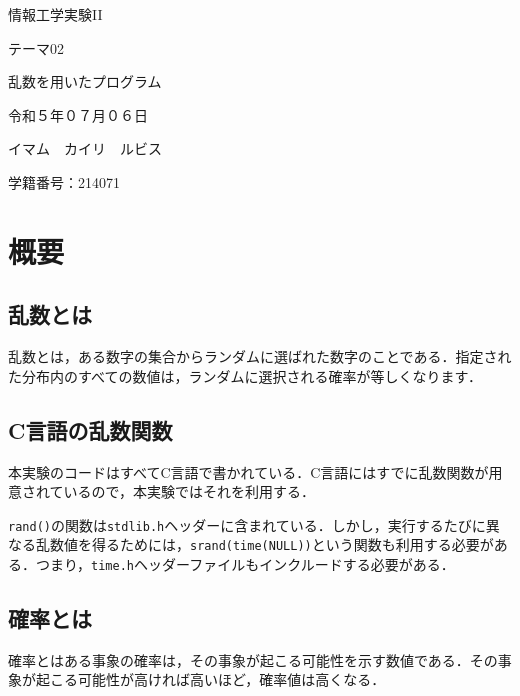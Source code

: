 \documentclass[a4j, titlepage]{jarticle}
\begin{document}
  \begin{center}
  \huge 情報工学実験II\par
  \vspace{15mm}
  \huge テーマ02 \par
  \huge 乱数を用いたプログラム \par
  \vspace{15mm}
  \vspace{20mm}
  \vspace{100mm}
  \Large 令和５年０７月０６日 \par
  \vspace{15mm}
  \Large イマム　カイリ　ルビス \par
  \vspace{10mm}
  \Large 学籍番号：214071\par
  \vspace{10mm}
\end{center}
\clearpage

\tableofcontents
\clearpage

\section{概要}
  \subsection{乱数とは}
    乱数とは，ある数字の集合からランダムに選ばれた数字のことである．指定された分布内のすべての数値は，ランダムに選択される確率が等しくなります．

  \subsection{C言語の乱数関数}
    本実験のコードはすべてC言語で書かれている．C言語にはすでに乱数関数が用意されているので，本実験ではそれを利用する．

    \texttt{rand()}の関数は\texttt{stdlib.h}ヘッダーに含まれている．しかし，実行するたびに異なる乱数値を得るためには，\texttt{srand(time(NULL))}という関数も利用する必要がある．つまり，\texttt{time.h}ヘッダーファイルもインクルードする必要がある．\cite{cite:rand}

  \subsection{確率とは}
    確率とはある事象の確率は，その事象が起こる可能性を示す数値である．その事象が起こる可能性が高ければ高いほど，確率値は高くなる．\cite{cite:wiki}
  
\end{document}
